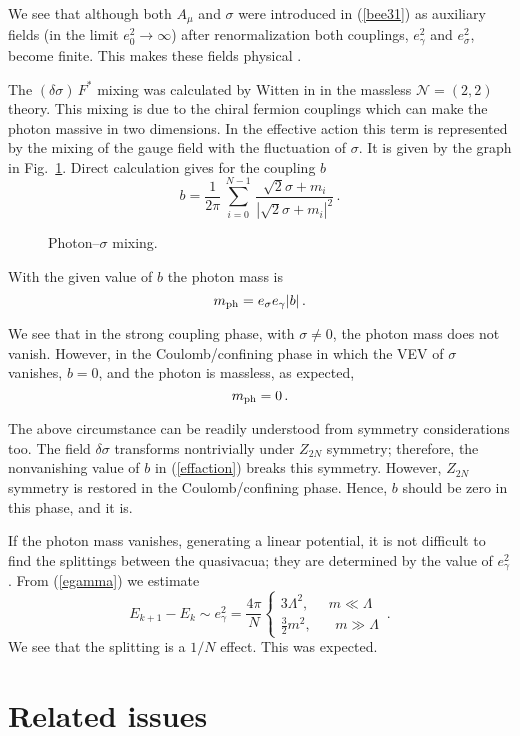 \documentclass[epsfig,12pt]{article}
\def\beq{\begin{equation}}
\def\eeq{\end{equation}}
\def\beq{\begin{equation}}
\def\eeq{\end{equation}}
\newcommand{\ntwot}{${\mathcal N}= \left(2,2\right) $ }
\begin{document}
{We see that although both $A_{\mu}$ and $\sigma$ were introduced in (\ref{bee31})
as auxiliary fields (in the limit $e^2_0\to\infty$) after renormalization both 
couplings, $e^2_{\gamma}$ and  $e^2_{\sigma}$, become finite. This makes these
fields physical \cite{W79}.

The $(\delta \sigma)\, F^{*}$ mixing was calculated by Witten in \cite{W79}
in the massless \ntwot theory. This mixing  is due to
the chiral fermion couplings which can make the photon massive in two dimensions. In the effective action
this term is represented by the mixing of the gauge field with the fluctuation of 
$\sigma$. It is given by the graph in Fig.~\ref{fig:photsig}. Direct calculation gives
for the coupling $b$ 
\beq
b= \frac{1}{2\pi}\,\sum_{i=0}^{N-1}\,\frac{\sqrt{2}\sigma+m_i}{|\sqrt{2}\sigma+m_i|^2}\,.
\label{gamma}
\eeq
\begin{figure}
\epsfxsize=6cm
\centerline{}
\caption{\small
Photon--$\sigma$ mixing. }
\label{fig:photsig}
\end{figure}
With the given value of $b$ the photon mass is
\beq
m_{\rm ph}=  e_{\sigma}e_{\gamma}|b| \,.
\label{phmass}
\eeq

We see that in the strong coupling phase, with   $\sigma\neq 0$, the photon mass does not vanish.
However, 
 in the Coulomb/confining phase in which the VEV of $\sigma$ vanishes,   $b =0$, 
 and 
the photon is massless, as expected,
\beq
m_{\rm ph}=0\, .
\eeq

The above circumstance can be readily understood from symmetry considerations too.
The field $\delta \sigma$ transforms
nontrivially under $Z_{2N}$ symmetry; therefore, the  nonvanishing value of $b$ in (\ref{effaction})
breaks this symmetry. However, $Z_{2N}$ symmetry is restored in the Coulomb/confining phase.
Hence, $b$ should be zero in this phase, and it is.

If the photon mass vanishes,
generating a linear potential, it is not difficult to find the splittings between 
the quasivacua; they are determined by the value of
$e_{\gamma}^2$. From (\ref{egamma}) we  estimate
\beq
E_{k+1}-E_{k}\sim e^2_{\gamma}
=\frac{4\pi}{N}\left\{
\begin{array}{cc}
3\Lambda^2,\;\;\;\;\; m\ll \Lambda\\[2mm]
\frac32 m^2,\;\;\;\;\;\; m\gg \Lambda
\end{array}\,.
\right.
\label{split}
\eeq
We see that the splitting is a $1/N$ effect. This was expected.

\section{Related issues}
\label{relais}
\setcounter{equation}{0}

}
\end{document}
